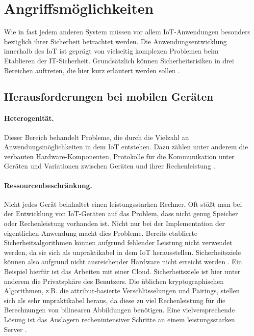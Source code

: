 \section{Angriffsmöglichkeiten}\label{sec:possible-attacks}
Wie in fast jedem anderen System müssen vor allem IoT-Anwendungen besonders
bezüglich ihrer Sicherheit betrachtet werden. Die Anwendungsentwicklung
innerhalb des IoT ist geprägt von vielseitig komplexen Problemen beim Etablieren
der IT-Sicherheit. Grundsätzlich können Sicherheitsrisiken in drei Bereichen
auftreten, die hier kurz erläutert werden sollen \cite{paper}.

\subsection{Herausforderungen bei mobilen Geräten}
\paragraph{Heterogenität.}
Dieser Bereich behandelt Probleme, die durch die Vielzahl an
Anwendungsmöglichkeiten in dem IoT entstehen. Dazu zählen unter anderem
die verbauten Hardware-Komponenten, Protokolle für die Kommunikation unter
Geräten und Variationen zwischen Geräten und ihrer Rechenleistung \cite{paper}.

\paragraph{Ressourcenbeschränkung.}
Nicht jedes Gerät beinhaltet einen leistungsstarken Rechner. Oft stößt man bei
der Entwicklung von IoT-Geräten auf das Problem, dass nicht genug Speicher oder
Rechenleistung vorhanden ist. Nicht nur bei der Implementation der eigentlichen
Anwendung macht dies Probleme. Bereits etablierte Sicherheitsalgorithmen können
aufgrund fehlender Leistung nicht verwendet werden, da sie sich als
unpraktikabel in dem IoT herausstellen. Sicherheitsziele können also aufgrund
nicht ausreichender Hardware nicht erreicht werden \cite{paper}. Ein Beispiel
hierfür ist das Arbeiten mit einer Cloud. Sicherheitsziele ist hier unter
anderem die Privatsphäre des Benutzers. Die üblichen kryptographischen
Algorithmen, z.B. die attribut-basierte Verschlüsselungen und Pairings, stellen
sich als sehr unpraktikabel heraus, da diese zu viel Rechenleistung für die
Berechnungen von bilinearen Abbildungen benötigen. Eine vielversprechende Lösung
ist das Auslagern rechenintensiver Schritte an einem leistungsstarken Server
\cite{phoabe}.

